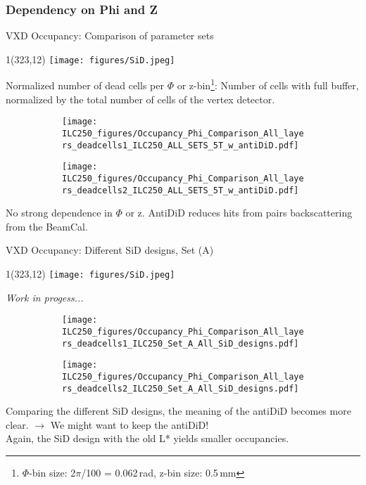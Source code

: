 \documentclass[xcolor={dvipsnames}]{beamer}
\newcommand{\sidlogo}{
  \setlength{\TPHorizModule}{1pt}
  \setlength{\TPVertModule}{1pt}
  \begin{textblock}{1}(323,12)
   \texttt{[image: figures/SiD.jpeg]}
  \end{textblock}
  }
\begin{document}
\subsubsection{Dependency on Phi and Z}
\begin{frame}{VXD Occupancy: Comparison of parameter sets}
\sidlogo
\alert{Normalized number of dead cells per $\Phi$ or z-bin}\footnote{$\Phi$-bin size: 2$\pi$/100 = 0.062\,rad, z-bin size: 0.5\,mm}: Number of cells with full buffer, normalized by the total number of cells of the vertex detector.
\begin{figure}
\centering
\begin{subfigure}[t]{0.48\textwidth}
\centering
\texttt{[image: ILC250\_figures/Occupancy\_Phi\_Comparison\_All\_layers\_deadcells1\_ILC250\_ALL\_SETS\_5T\_w\_antiDiD.pdf]}
 \end{subfigure}
\hspace*{0.2cm}
\begin{subfigure}[t]{0.48\textwidth}
\centering
\texttt{[image: ILC250\_figures/Occupancy\_Phi\_Comparison\_All\_layers\_deadcells2\_ILC250\_ALL\_SETS\_5T\_w\_antiDiD.pdf]}
\end{subfigure}
\end{figure}
No strong dependence in $\Phi$ or z. AntiDiD reduces hits from pairs backscattering from the BeamCal.
\end{frame}

\begin{frame}{VXD Occupancy: Different SiD designs, Set (A)}
\sidlogo
\flushright \textit{Work in progess...}
\begin{figure}
\centering
\begin{subfigure}[t]{0.48\textwidth}
\centering
\texttt{[image: ILC250\_figures/Occupancy\_Phi\_Comparison\_All\_layers\_deadcells1\_ILC250\_Set\_A\_All\_SiD\_designs.pdf]}
 \end{subfigure}
\hspace*{0.2cm}
\begin{subfigure}[t]{0.48\textwidth}
\centering
\texttt{[image: ILC250\_figures/Occupancy\_Phi\_Comparison\_All\_layers\_deadcells2\_ILC250\_Set\_A\_All\_SiD\_designs.pdf]}
\end{subfigure}
\end{figure}
\flushleft Comparing the different SiD designs, the meaning of the antiDiD becomes more clear. $\rightarrow$ We might want to keep the antiDiD!\\
Again, the SiD design with the old L* yields smaller occupancies.
\end{frame}
\end{document}
